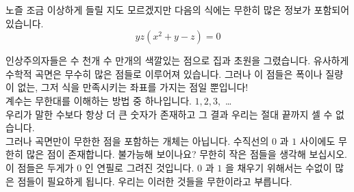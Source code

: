\begin{surferPage}{노즐}
조금 이상하게 들릴 지도 모르겠지만 다음의 식에는 무한히 많은 정보가 포함되어 있습니다.\\
\smallskip
\[y z (x^2	+ y - z)	= 0\]

\vspace{0.3cm}
인상주의자들은 수 천개 수 만개의 색깔있는 점으로 집과 초원을 그렸습니다. 유사하게 수학적 곡면은 무수히 많은 점들로 이루어져 있습니다. 그러나 이 점들은 폭이나 질량이 없는, 그저 식을 만족시키는 좌표를 가지는 점일 뿐입니다! \\
\vspace{0.3cm}
계수는 무한대를 이해하는 방법 중 하나입니다. $1, 2, 3,$ \dots\\
우리가 말한 수보다 항상 더 큰 숫자가 존재하고 그 결과 우리는 절대 끝까지 셀 수 없습니다. \\
\vspace{0.3cm}
그러나 곡면만이 무한한 점을 포함하는 개체는 아닙니다. 수직선의 $0$ 과 $1$ 사이에도 무한히 많은 점이 존재합니다. 불가능해 보이나요? 무한히 작은 점들을 생각해 보십시오.  이 점들은 두게가 0 인 연필로 그려진 것입니다. $0$ 과 $1$ 을 채우기 위해서는 수없이 많은 점들이 필요하게 됩니다. 우리는 이러한 것들을 무한이라고 부릅니다.
\end{surferPage}
